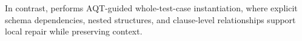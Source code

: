 \documentclass[conference]{IEEEtran}
\begin{document}
In contrast, \tool{} performs AQT-guided whole-test-case instantiation, where explicit schema dependencies, nested structures, and clause-level relationships support local repair while preserving context.




\end{document}
